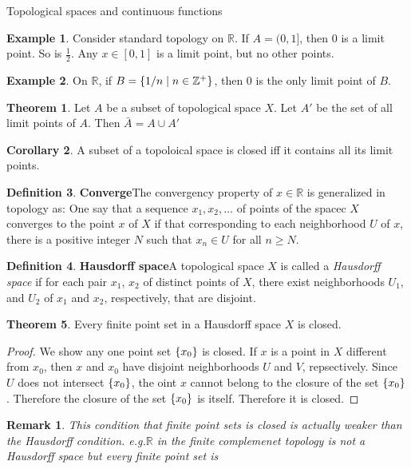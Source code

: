 \documentclass{report}
\newtheorem*{remark}{Remark}
\theoremstyle{definition}
\newtheorem{theorem}{Theorem}[chapter]
\newtheorem{definition}[theorem]{Definition}
\newtheorem{example}{Example}[theorem]
\newtheorem{corollary}[theorem]{Corollary}
\newcommand{\defn}[1]{\textbf{#1}\label{#1}\index{#1}}
\newcommand{\set}[1]{\ensuremath\{#1\}}
\newcommand{\eg}{\textit{e.g.}\xspace}
\newcommand{\ZZ}{\mathbb{Z}}
\newcommand{\RR}{\mathbb{R}}
\newcommand{\union}{\cup}
\newcommand{\closure}[1]{\bar{#1}}
\begin{document}
\begin{chapter}{Topological spaces and continuous functions}
\begin{example}
    Consider standard topology on $\RR$. If $A=(0,1]$, then $0$ is a
    limit point. So is $\frac{1}{2}$. Any $x\in[0,1]$ is a limit
    point, but no other points.
  \end{example}
  \begin{example}
    On $\RR$, if $B=\set{1/n\mid n\in\ZZ^+}$, then $0$ is the only
    limit point of $B$.
  \end{example}
  \begin{theorem}
    Let $A$ be a subset of topological space $X$. Let $A'$ be the set
    of all limit points of $A$. Then
    $\closure{A}=A\union A'$
  \end{theorem}
  \begin{corollary}
    A subset of a topoloical space is closed iff it contains all its
    limit points.
  \end{corollary}
  \begin{definition}\defn{Converge}
    The convergency property of $x\in\RR$ is generalized in topology
    as:
    One say that a sequence $x_1,x_2,\ldots$ of points of the spacec
    $X$ converges to the point $x$ of $X$ if that corresponding to
    each neighborhood $U$ of $x$, there is a positive integer $N$ such
    that $x_n\in U$ for all $n\geq N$.
  \end{definition}
  \begin{definition}\defn{Hausdorff space}
    A topological space $X$ is called a \emph{Hausdorff space} if for
    each pair $x_1$, $x_2$ of distinct points of $X$, there exist
    neighborhoods $U_1$, and $U_2$ of $x_1$ and $x_2$, respectively,
    that are disjoint.
  \end{definition}
  \begin{theorem}
    Every finite point set in a Hausdorff space $X$ is closed.
  \end{theorem}
  \begin{proof}
    We show any one point set $\set{x_0}$ is closed. If $x$ is a point
    in $X$ different from $x_0$, then $x$ and $x_0$ have disjoint
    neighborhoods $U$ and $V$, repsectively. Since $U$ does not
    intersect $\set{x_0}$, the oint $x$ cannot belong to the closure
    of the set $\set{x_0}$. Therefore the closure of the set
    $\set{x_0}$ is itself. Therefore it is closed.
  \end{proof}
  \begin{remark}
    This condition that finite point sets is closed is actually weaker
    than the Hausdorff condition. \eg $\RR$ in the finite complemenet
    topology is not a Hausdorff space but every finite point set is

\end{remark}
\end{chapter}
\end{document}
